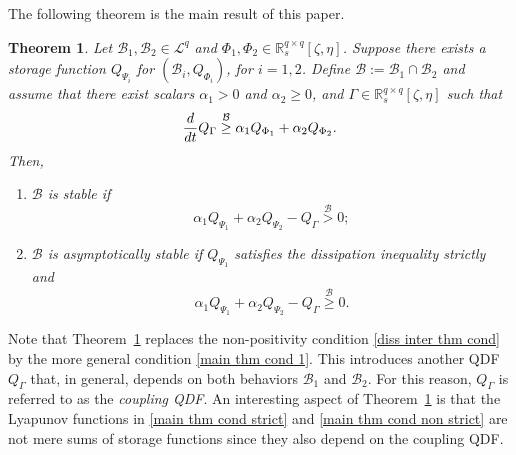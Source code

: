 \documentclass[letterpaper, 10 pt, conference]{ieeeconf}
\theoremstyle{ieeeconf}
\newtheorem{theorem}{Theorem}
\newcommand{\R}{\mathbb{R}}
\newcommand{\B}{\mathcal{B}}
\begin{document}
The following theorem is the main result of this paper.
\begin{theorem}
	Let $\B_1,\B_2 \in \mathcal{L}^q$ and ${\Phi_1, \Phi_2 \in \R_s^{q \times q}[\zeta,\eta]}$. 
	Suppose there exists a storage function $Q_{\Psi_i}$ for $(\B_i, Q_{\Phi_i})$, for $i=1,2$. Define $\B := \B_1 \cap \B_2$ and assume that there exist scalars $\alpha_1>0$ and $\alpha_2\geq 0$, and $\Gamma\in \R_s^{q \times q}[\zeta,\eta]$ such that 
	\begin{equation}
		\frac{d}{dt}Q_\Gamma \stackrel{\B}{\geq}\alpha_1Q_{\Phi_1}+\alpha_2Q_{\Phi_2}.
		\label{main thm cond 1}
		\vspace{-1ex}
	\end{equation}
	Then,
	\begin{enumerate}[label=\roman*)]
		\item $\B$ is stable if
		\vspace{-1.5ex}
		\begin{equation}
			\alpha_1Q_{\Psi_1}+\alpha_2Q_{\Psi_2}-Q_\Gamma \stackrel{\B}{>} 0;
			\label{main thm cond strict}
		\end{equation} \label{main thm stat 1}
		\vspace{-2ex}
		\item $\B$ is asymptotically stable if $Q_{\Psi_1}$ satisfies the dissipation inequality strictly and
		\vspace{-1.5ex}
		\begin{equation}
			\alpha_1Q_{\Psi_1}+\alpha_2Q_{\Psi_2}-Q_\Gamma \stackrel{\B}{\geq} 0.
			\label{main thm cond non strict}
		\end{equation}\label{main thm stat 2}
	\end{enumerate} 
	\label{t: main diss inter thm}
\end{theorem}
\vspace{-3ex}
Note that Theorem~\ref{t: main diss inter thm} replaces the non-positivity condition \eqref{diss inter thm cond} by the more general condition \eqref{main thm cond 1}. This introduces another QDF $Q_\Gamma$ that, in general, depends on both behaviors $\B_1$ and $\B_2$. For this reason, $Q_\Gamma$ is referred to as the \emph{coupling QDF}. An interesting aspect of Theorem~\ref{t: main diss inter thm} is that the Lyapunov functions in \eqref{main thm cond strict} and \eqref{main thm cond non strict} are not mere sums of storage functions since they also depend on the coupling QDF.
\end{document}
